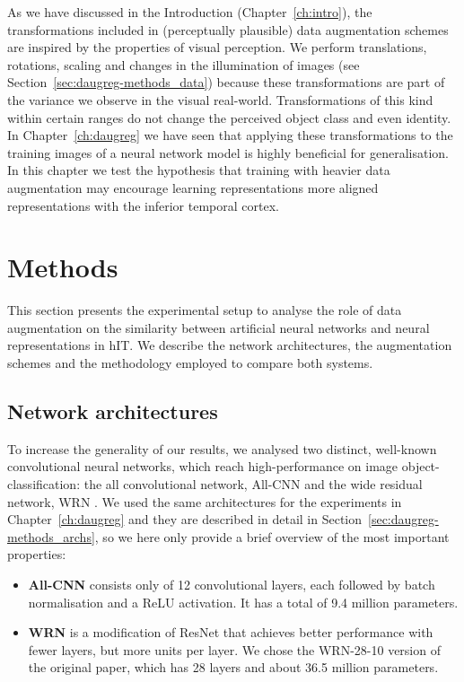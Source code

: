 {As we have discussed in the Introduction (Chapter~\ref{ch:intro}), the transformations included in (perceptually plausible) data augmentation schemes are inspired by the properties of visual perception. We perform translations, rotations, scaling and changes in the illumination of images (see Section~\ref{sec:daugreg-methods_data}) because these transformations are part of the variance we observe in the visual real-world. Transformations of this kind within certain ranges do not change the perceived object class and even identity. In Chapter~\ref{ch:daugreg} we have seen that applying these transformations to the training images of a neural network model is highly beneficial for generalisation. In this chapter we test the hypothesis that training with heavier data augmentation may encourage learning representations more aligned representations with the inferior temporal cortex.
% 

\section{Methods}
\label{sec:daugit-methods}
This section presents the experimental setup to analyse the role of data augmentation on the similarity between artificial neural networks and neural representations in hIT. We describe the network architectures, the augmentation schemes and the methodology employed to compare both systems.

\subsection{Network architectures}
To increase the generality of our results, we analysed two distinct, well-known convolutional neural networks, which reach high-performance on image object-classification: the all convolutional network, All-CNN \citep{springenberg2014allcnn} and the wide residual network, WRN \citep{zagoruyko2016wrn}. We used the same architectures for the experiments in Chapter~\ref{ch:daugreg} and they are described in detail in Section~\ref{sec:daugreg-methods_archs}, so we here only provide a brief overview of the most important properties:

\begin{itemize}
 \item \textbf{All-CNN} consists only of 12 convolutional layers, each followed by batch normalisation and a ReLU activation. It has a total of 9.4 million parameters.
 \item \textbf{WRN} is a modification of ResNet \citep{he2016resnet} that achieves better performance with fewer layers, but more units per layer. We chose the WRN-28-10 version of the original paper, which has 28 layers and about 36.5 million parameters.
\end{itemize}

}
